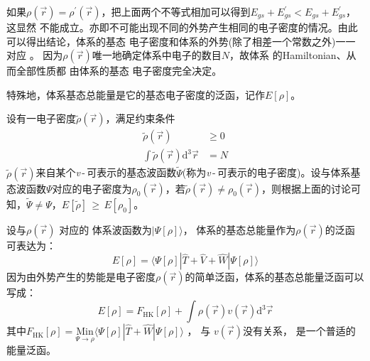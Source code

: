 {%
{如果}$\rho(\vec{r})\!=\!\rho^{\prime}(\vec{r})$，把上面两个不等式相加可以得到$E_{gs}+E^{\prime}_{gs}\!<\!E_{gs}+E^{\prime}_{gs}$，这显然%
{不能成立。亦即不可能出现不同的外势产生相同的电子密度的情况}。由此可以得出结论，体系的基态%
{电}子密度和体系的外势(除了相差一个常数之外)一一对应%
{。}%
{因为$\rho(\vec r)$唯一地确定体系中电子的数目$N$，故}体系%
{%
的\textrm{Hamiltonian}、从而全部}性质都%
由体系的基态%
{电}子密度完全决定。{特殊地，体系基态总能量是它的基态电子密度的泛函，记作$E[\rho]$。
	
设有一电子密度$\tilde\rho(\vec r)$，满足约束条件
\begin{displaymath}
	\begin{aligned}
		\tilde\rho(\vec r)\!&\geqslant\!0\\
		\int\tilde\rho(\vec r)\textrm{d}^3\vec r&\!=\!N
	\end{aligned}
\end{displaymath}
$\tilde\rho(\vec r)$来自某个\textit{v}\,-\,可表示的基态波函数$\tilde\Psi$(称为\textit{v}\,-\,可表示的电子密度)。设与体系基态波函数$\Psi$对应的电子密度为$\rho_0(\vec r)$，若$\tilde\rho(\vec r)\!\neq\!\rho_0(\vec r)$，则根据上面的讨论可知，$\tilde\Psi\!\neq\!\Psi$，$E[\tilde\rho]$\,$\geqslant$\,$E[\rho_0]$。}

{设}与$\rho(\vec{r})$%
对应的%
体系波函数为$|\Psi[\rho]\rangle$，%
体系的基态总能量作为$\rho(\vec{r})
$的泛函%
{可表达}为：
\begin{equation}
	E[\rho]=\langle\Psi[\rho]|\hat{T}+\hat{V}+\hat{W}|\Psi[\rho]\rangle
	\label{eq:DFT_02}
\end{equation}
{因为由外势产生的势能是电子密度$\rho(\vec r)$的简单泛函，}体系的{基态}总能量泛函可以写成：
\begin{equation}
	E[\rho]=F_{\mathrm{HK}}[\rho]+\int\rho(\vec{r})v(\vec{r})\textrm{d}^3\vec{r}
	\label{eq:DFT_03}
\end{equation}
其中$F_{\mathrm{HK}}[\rho]=\underset{\Psi\to\rho}{\mathrm{Min}}\langle\Psi[\rho]|\hat{T}+\hat{W}|\Psi[\rho]\rangle$%
{，}%
与%
{$v(\vec r)$}没有关系，%
{是一个普适的能量泛函。}

}
